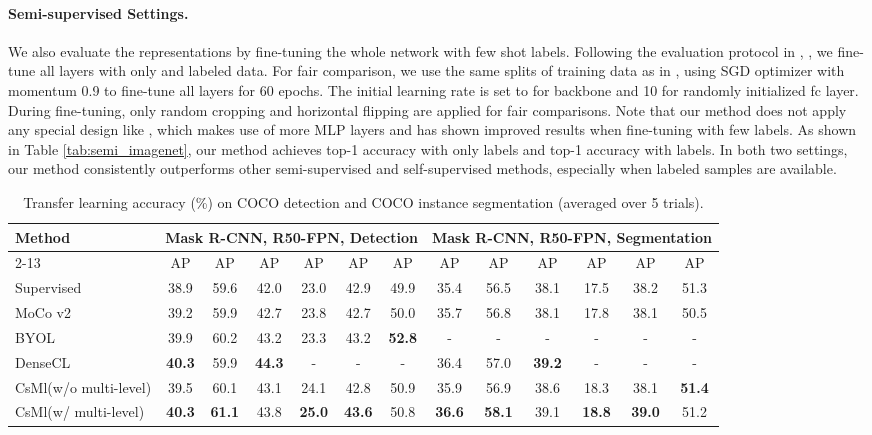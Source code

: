 \documentclass[10pt,twocolumn,letterpaper]{article}
\begin{document}
\paragraph{Semi-supervised Settings.} We also evaluate the representations by fine-tuning the whole network with few shot labels. Following the evaluation protocol in \cite{chen2020simple}, \cite{chen2020big}, we fine-tune all layers with only  and  labeled data. For fair comparison, we use the same splits of training data as in \cite{chen2020simple}, using SGD optimizer with momentum 0.9 to fine-tune all layers for 60 epochs. The initial learning rate is set to  for backbone and 10 for randomly initialized fc layer. During fine-tuning, only random cropping and horizontal flipping are applied for fair comparisons. Note that our method does not apply any special design like \cite{chen2020big}, which makes use of more MLP layers and has shown improved results when fine-tuning with few labels. As shown in Table \ref{tab:semi_imagenet}, our method achieves  top-1 accuracy with only  labels and  top-1 accuracy with  labels. In both two settings, our method consistently outperforms other semi-supervised and self-supervised methods, especially when  labeled samples are available.

\begin{table*}[]
\renewcommand\arraystretch{1.2}
\setlength{\tabcolsep}{2.0mm}
\caption{Transfer learning accuracy (\%) on COCO detection and COCO instance segmentation (averaged over 5 trials).}
\vspace{0.05in}
\centering
\begin{tabular}{l|cccccc|cccccc}
\hline
\multirow{3}{*}{Method} & \multicolumn{6}{c|}{Mask R-CNN, R50-FPN, Detection}  &\multicolumn{6}{c}{Mask R-CNN, R50-FPN, Segmentation} \\ \cline{2-13}
& AP  & AP & AP & AP  & AP &AP &AP  &AP  &AP  &AP  &AP &AP \\ \hline

Supervised                  &38.9  &59.6  &42.0  &23.0  &42.9  &49.9    &35.4  &56.5  &38.1  &17.5  &38.2 &51.3     \\ \hline
MoCo v2 \cite{chen2020improved} &39.2  &59.9 &42.7 &23.8 &42.7 &50.0    &35.7  &56.8  &38.1  &17.8  &38.1  &50.5   \\
BYOL \cite{grill2020bootstrap} &39.9 &60.2 &43.2 &23.3 &43.2 &\textbf{52.8}   &- &-	&- &- &- &-\\
DenseCL\cite{wang2020dense}  &\textbf{40.3} &59.9 &\textbf{44.3} &- &- &-    &36.4 &57.0 &\textbf{39.2} &- &- &- \\ \hline

CsMl(w/o multi-level) &39.5 &60.1 &43.1 &24.1 &42.8 &50.9  &35.9 &56.9 &38.6 &18.3 &38.1 &\textbf{51.4} \\
CsMl(w/ multi-level) &\textbf{40.3}  &\textbf{61.1} &43.8 &\textbf{25.0} &\textbf{43.6} &50.8 &\textbf{36.6}  &\textbf{58.1}  &39.1  &\textbf{18.8}  &\textbf{39.0}  &51.2 \\ \hline
\end{tabular}
\label{tab: coco_detec}
\end{table*}
\end{document}
